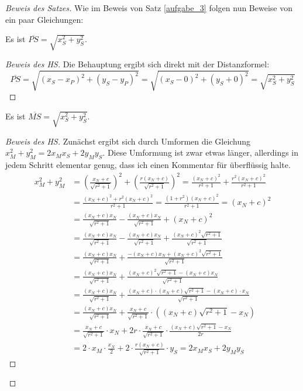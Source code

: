 \begin{proof}[Beweis des Satzes]
    Wie im Beweis von Satz \ref{aufgabe_3} folgen nun Beweise von ein paar Gleichungen:
    \begin{lem}\label{dumm_P}
        Es ist $\overline{PS}=\sqrt{x_S^2+y_S^2}$.
    \end{lem}
    \begin{proof}[Beweis des HS]
        Die Behauptung ergibt sich direkt mit der Distanzformel:
        \[
        \overline{PS}=\sqrt{(x_S-x_P)^2+(y_S-y_P)^2}=\sqrt{(x_S-0)^2+(y_S+0)^2}=\sqrt{x_S^2+y_S^2}    
        \]
    \end{proof}
    \begin{lem}\label{dumm_M}
        Es ist $\overline{MS}=\sqrt{x_S^2+y_S^2}$.
    \end{lem}
    \begin{proof}[Beweis des HS]
        Zunächst ergibt sich durch Umformen die Gleichung $x_M^2+y_M^2=2x_Mx_S+2y_My_S$. Diese Umformung ist 
        zwar etwas länger, allerdings in jedem Schritt elementar genug, dass ich einen Kommentar für überflüssig 
        halte.
        \begin{align*}
            x_M^2+y_M^2&=\left(\frac{x_N+c}{\sqrt{r^2+1}}\right)^2+\left(\frac{r(x_N+c)}{\sqrt{r^2+1}}\right)^2
            =\frac{(x_N+c)^2}{r^2+1}+\frac{r^2(x_N+c)^2}{r^2+1}\\
            &=\frac{(x_N+c)^2+r^2(x_N+c)^2}{r^2+1}=\frac{(1+r^2)(x_N+c)^2}{r^2+1}=(x_N+c)^2\\
            &=\frac{(x_N+c)x_N}{\sqrt{r^2+1}}-\frac{(x_N+c)x_N}{\sqrt{r^2+1}}+(x_N+c)^2\\
            &=\frac{(x_N+c)x_N}{\sqrt{r^2+1}}-\frac{(x_N+c)x_N}{\sqrt{r^2+1}}+\frac{(x_N+c)^2\sqrt{r^2+1}}{\sqrt{r^2+1}}\\
            &=\frac{(x_N+c)x_N}{\sqrt{r^2+1}}+\frac{-(x_N+c)x_N+(x_N+c)^2\sqrt{r^2+1}}{\sqrt{r^2+1}}\\
            &=\frac{(x_N+c)x_N}{\sqrt{r^2+1}}+\frac{(x_N+c)^2\sqrt{r^2+1}-(x_N+c)x_N}{\sqrt{r^2+1}}\\
            &=\frac{(x_N+c)x_N}{\sqrt{r^2+1}}+\frac{(x_N+c)\cdot(x_N+c)\sqrt{r^2+1}-(x_N+c)\cdot x_N}{\sqrt{r^2+1}}\\
            &=\frac{(x_N+c)x_N}{\sqrt{r^2+1}}+\frac{x_N+c}{\sqrt{r^2+1}}\cdot \left((x_N+c)\sqrt{r^2+1}-x_N\right)\\
            &=\frac{x_N+c}{\sqrt{r^2+1}}\cdot x_N+2r\cdot\frac{x_N+c}{\sqrt{r^2+1}}\cdot\frac{(x_N+c)\sqrt{r^2+1}-x_N}{2r}\\
            &=2\cdot x_M\cdot\frac{x_N}{2}+2\cdot\frac{r(x_N+c)}{\sqrt{r^2+1}}\cdot y_S=2x_Mx_S+2y_My_S

\end{align*}
\end{proof}
\end{proof}
